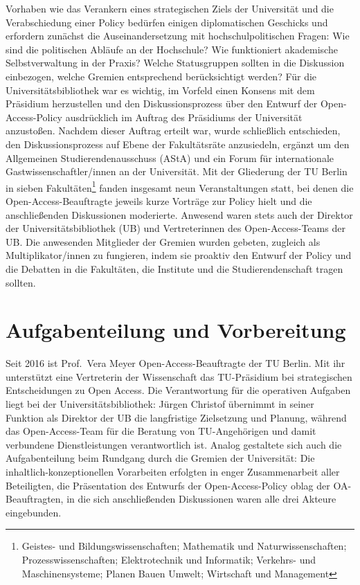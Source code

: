 \documentclass[a4paper,
fontsize=11pt,
oneside,
numbers=noperiodatend,
parskip=half-,
bibliography=totoc,
final
]{scrartcl}
\begin{document}
Vorhaben wie das Verankern eines strategischen Ziels der Universität und
die Verabschiedung einer Policy bedürfen einigen diplomatischen
Geschicks und erfordern zunächst die Auseinandersetzung mit
hochschulpolitischen Fragen: Wie sind die politischen Abläufe an der
Hochschule? Wie funktioniert akademische Selbstverwaltung in der Praxis?
Welche Statusgruppen sollten in die Diskussion einbezogen, welche
Gremien entsprechend berücksichtigt werden? Für die
Universitätsbibliothek war es wichtig, im Vorfeld einen Konsens mit dem
Präsidium herzustellen und den Diskussionsprozess über den Entwurf der
Open-Access-Policy ausdrücklich im Auftrag des Präsidiums der
Universität anzustoßen. Nachdem dieser Auftrag erteilt war, wurde
schließlich entschieden, den Diskussionsprozess auf Ebene der
Fakultätsräte anzusiedeln, ergänzt um den Allgemeinen
Studierendenausschuss (AStA) und ein Forum für internationale
Gastwissenschaftler/innen an der Universität. Mit der Gliederung der TU
Berlin in sieben Fakultäten\footnote{Geistes- und
  Bildungswissenschaften; Mathematik und Naturwissenschaften;
  Prozesswissenschaften; Elektrotechnik und Informatik; Verkehrs- und
  Maschinensysteme; Planen Bauen Umwelt; Wirtschaft und Management}
fanden insgesamt neun Veranstaltungen statt, bei denen die
Open-Access-Beauftragte jeweils kurze Vorträge zur Policy hielt und die
anschließenden Diskussionen moderierte. Anwesend waren stets auch der
Direktor der Universitätsbibliothek (UB) und Vertreterinnen des
Open-Access-Teams der UB. Die anwesenden Mitglieder der Gremien wurden
gebeten, zugleich als Multiplikator/innen zu fungieren, indem sie
proaktiv den Entwurf der Policy und die Debatten in die Fakultäten, die
Institute und die Studierendenschaft tragen sollten.

\hypertarget{aufgabenteilung-und-vorbereitung}{%
\section*{Aufgabenteilung und
Vorbereitung}\label{aufgabenteilung-und-vorbereitung}}

Seit 2016 ist Prof.~Vera Meyer Open-Access-Beauftragte der TU Berlin.
Mit ihr unterstützt eine Vertreterin der Wissenschaft das TU-Präsidium
bei strategischen Entscheidungen zu Open Access. Die Verantwortung für
die operativen Aufgaben liegt bei der Universitätsbibliothek: Jürgen
Christof übernimmt in seiner Funktion als Direktor der UB die
langfristige Zielsetzung und Planung, während das Open-Access-Team für
die Beratung von TU-Angehörigen und damit verbundene Dienstleistungen
verantwortlich ist. Analog gestaltete sich auch die Aufgabenteilung beim
Rundgang durch die Gremien der Universität: Die
inhaltlich-konzeptionellen Vorarbeiten erfolgten in enger Zusammenarbeit
aller Beteiligten, die Präsentation des Entwurfs der Open-Access-Policy
oblag der OA-Beauftragten, in die sich anschließenden Diskussionen waren
alle drei Akteure eingebunden.
\end{document}
